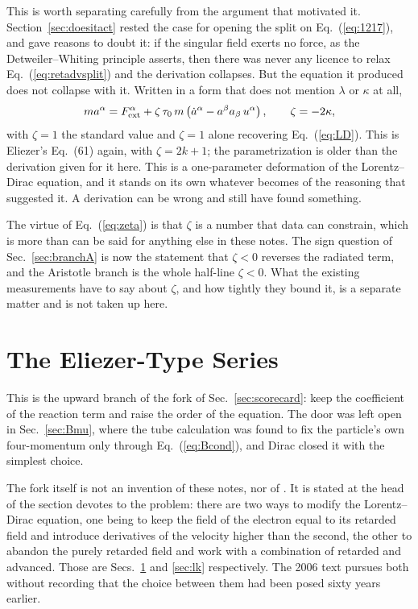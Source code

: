 \documentclass[preprint]{aastex701}
\newcommand{\Fext}{F^\alpha_{\rm ext}}
\newcommand{\taunought}{\tau_0}
\begin{document}
This is worth separating carefully from the argument that motivated it.
Section~\ref{sec:doesitact} rested the case for opening the split on
Eq.~(\ref{eq:1217}), and gave reasons to doubt it: if the singular field exerts
no force, as the Detweiler--Whiting principle asserts, then there was never any
licence to relax Eq.~(\ref{eq:retadvsplit}) and the derivation collapses. But
the equation it produced does not collapse with it. Written in a form that does
not mention $\lambda$ or $\kappa$ at all,
\begin{equation}
ma^\alpha = \Fext + \zeta\,\taunought\, m
\left(\dot a^\alpha - a^\beta a_\beta\,u^\alpha\right),
\qquad \zeta = -2\kappa ,
\label{eq:zeta}
\end{equation}
with $\zeta=1$ the standard value and $\zeta=1$ alone recovering
Eq.~(\ref{eq:LD}). This is Eliezer's Eq.~(61) again, with $\zeta = 2k+1$; the
parametrization is older than the derivation given for it here. This is a one-parameter deformation of the Lorentz--Dirac
equation, and it stands on its own whatever becomes of the reasoning that
suggested it. A derivation can be wrong and still have found something.

The virtue of Eq.~(\ref{eq:zeta}) is that $\zeta$ is a number that data can
constrain, which is more than can be said for anything else in these notes. The
sign question of Sec.~\ref{sec:branchA} is now the statement that $\zeta<0$
reverses the radiated term, and the Aristotle branch is the whole half-line
$\zeta<0$. What the existing measurements have to say about $\zeta$, and how
tightly they bound it, is a separate matter and is not taken up here.

\section{The Eliezer-Type Series}
\label{sec:eliezer}

This is the upward branch of the fork of Sec.~\ref{sec:scorecard}: keep the
coefficient of the reaction term and raise the order of the equation. The door
was left open in Sec.~\ref{sec:Bmu}, where the tube calculation was found to fix
the particle's own four-momentum only through Eq.~(\ref{eq:Bcond}), and Dirac
closed it with the simplest choice.

The fork itself is not an invention of these notes, nor of \citet{zhang2006}. It
is stated at the head of the section \citet{eliezer1947} devotes to the problem:
there are two ways to modify the Lorentz--Dirac equation, one being to keep the
field of the electron equal to its retarded field and introduce derivatives of
the velocity higher than the second, the other to abandon the purely retarded
field and work with a combination of retarded and advanced. Those are
Secs.~\ref{sec:eliezer} and \ref{sec:lk} respectively. The 2006 text pursues
both without recording that the choice between them had been posed sixty years
earlier.
\end{document}
